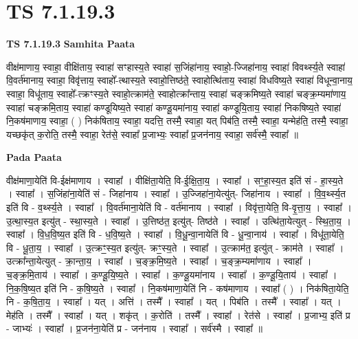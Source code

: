 \documentclass[17pt]{extarticle}
\begin{document}

\section{ TS 7.1.19.3 }

\textbf{TS 7.1.19.3 } \newline
\textbf{Samhita Paata} \newline

वीक्ष॑माणाय॒ स्वाहा॒ वीक्षि॑ताय॒ स्वाहा॑ सꣳहास्य॒ते स्वाहा॑ स॒जिंहा॑नाय॒ स्वाहो॒-ज्जिहा॑नाय॒ स्वाहा॑ विवर्थ्स्य॒ते स्वाहा॑ वि॒वर्त॑मानाय॒ स्वाहा॒ विवृ॑त्ताय॒ स्वाहो᳚-त्थास्य॒ते स्वाहो॒त्तिष्ठ॑ते॒ स्वाहोत्थि॑ताय॒ स्वाहा॑ विधविष्य॒ते स्वाहा॑ विधून्वा॒नाय॒ स्वाहा॒ विधू॑ताय॒ स्वाहो᳚-त्क्रꣳस्य॒ते स्वाहो॒त्क्राम॑ते॒ स्वाहोत्क्रा᳚न्ताय॒ स्वाहा॑ चङ्क्रमिष्य॒ते स्वाहा॑ चङ्क्र॒म्यमा॑णाय॒ स्वाहा॑ चङ्क्रमि॒ताय॒ स्वाहा॑ कण्डूयिष्य॒ते स्वाहा॑ कण्डू॒यमा॑नाय॒ स्वाहा॑ कण्डूयि॒ताय॒ स्वाहा॑ निकषिष्य॒ते स्वाहा॑ नि॒कष॑माणाय॒ स्वाहा॒ ( ) निक॑षिताय॒ स्वाहा॒ यदत्ति॒ तस्मै॒ स्वाहा॒ यत् पिब॑ति॒ तस्मै॒ स्वाहा॒ यन्मेह॑ति॒ तस्मै॒ स्वाहा॒ यच्छकृ॑त् क॒रोति॒ तस्मै॒ स्वाहा॒ रेत॑से॒ स्वाहा᳚ प्र॒जाभ्यः॒ स्वाहा᳚ प्र॒जन॑नाय॒ स्वाहा॒ सर्व॑स्मै॒ स्वाहा᳚ ॥ \newline

\textbf{Pada Paata} \newline

वीक्ष॑माणा॒येति॑ वि-ईक्ष॑माणाय । स्वाहा᳚ । वीक्षि॑ता॒येति॒ वि-ई॒क्षि॒ता॒य॒ । स्वाहा᳚ । सꣳ॒॒हा॒स्य॒त इति॑ सं - हा॒स्य॒ते । स्वाहा᳚ । स॒जिंहा॑ना॒येति॑ सं - जिहा॑नाय । स्वाहा᳚ । उ॒ज्जिहा॑ना॒येत्यु॑त्- जिहा॑नाय । स्वाहा᳚ । वि॒व॒र्थ्स्य॒त इति॑ वि - व॒र्थ्स्य॒ते । स्वाहा᳚ । वि॒वर्त॑माना॒येति॑ वि - वर्त॑मानाय । स्वाहा᳚ । विवृ॑त्ता॒येति॒ वि-वृ॒त्ता॒य॒ । स्वाहा᳚ । उ॒त्था॒स्य॒त इत्यु॑त् - स्था॒स्य॒ते । स्वाहा᳚ । उ॒त्तिष्ठ॑त॒ इत्यु॑त्- तिष्ठ॑ते । स्वाहा᳚ । उत्थि॑ता॒येत्युत् - स्थि॒ता॒य॒ । स्वाहा᳚ । वि॒ध॒वि॒ष्य॒त इति॑ वि - ध॒वि॒ष्य॒ते । स्वाहा᳚ । वि॒धू॒न्वा॒नायेति॑ वि - धू॒न्वा॒नाय॑ । स्वाहा᳚ । विधू॑ता॒येति॒ वि - धू॒ता॒य॒ । स्वाहा᳚ । उ॒त्क्रꣳ॒॒स्य॒त इत्यु॑त्- क्रꣳ॒॒स्य॒ते । स्वाहा᳚ । उ॒त्क्राम॑त॒ इत्यु॑त् - क्राम॑ते । स्वाहा᳚ । उत्क्रा᳚न्ता॒येत्युत् - क्रा॒न्ता॒य॒ । स्वाहा᳚ । च॒ङ्क्र॒मि॒ष्य॒ते । स्वाहा᳚ । च॒ङ्क्र॒म्यमा॑णाय । स्वाहा᳚ । च॒ङ्क्र॒मि॒ताय॑ । स्वाहा᳚ । क॒ण्डू॒यि॒ष्य॒ते । स्वाहा᳚ । क॒ण्डू॒यमा॑नाय । स्वाहा᳚ । क॒ण्डू॒यि॒ताय॑ । स्वाहा᳚ । नि॒क॒षि॒ष्य॒त इति॑ नि - क॒षि॒ष्य॒ते । स्वाहा᳚ । नि॒कष॑माणा॒येति॑ नि - कष॑माणाय । स्वाहा᳚ ( ) । निक॑षिता॒येति॒ नि - क॒षि॒ता॒य॒ । स्वाहा᳚ । यत् । अत्ति॑ । तस्मै᳚ । स्वाहा᳚ । यत् । पिब॑ति । तस्मै᳚ । स्वाहा᳚ । यत् । मेह॑ति । तस्मै᳚ । स्वाहा᳚ । यत् । शकृ॑त् । क॒रोति॑ । तस्मै᳚ । स्वाहा᳚ । रेत॑से । स्वाहा᳚ । प्र॒जाभ्य॒ इति॑ प्र - जाभ्यः॑ । स्वाहा᳚ । प्र॒जन॑ना॒येति॑ प्र - जन॑नाय । स्वाहा᳚ । सर्व॑स्मै । स्वाहा᳚ ॥  \newline
\end{document}
